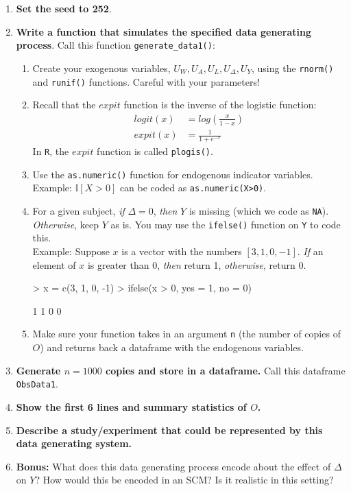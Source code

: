 \documentclass[answers]{exam}
\begin{document}
\begin{enumerate}
\item \textbf{Set the seed to 252}.
\item \textbf{Write a function that simulates the specified data generating process}. Call this function \texttt{generate\_data1()}:
\begin{enumerate}
\item Create your exogenous variables, $U_W, U_A, U_L, U_\Delta, U_Y$, using the \texttt{rnorm()} and \texttt{runif()} functions. Careful with your parameters!
\item Recall that the $expit$ function is the inverse of the logistic function:
\begin{align*}
logit(x) &= log\left(\frac{x}{1-x} \right)\\
expit(x) &=\frac{1}{1+e^{-x}}
 \end{align*}
In \texttt{R}, the $expit$ function is called \texttt{plogis()}.
\item Use the \texttt{as.numeric()} function for endogenous indicator variables. \\
Example: $\mathbb{I}[X > 0]$ can be coded as \texttt{as.numeric(X>0)}.
\item For a given subject, \textit{if} $\Delta = 0$, \textit{then} $Y$ is missing (which we code as \texttt{NA}). \textit{Otherwise}, keep $Y$ as is. You may use the \texttt{ifelse()} function on \texttt{Y} to code this. \\
Example: Suppose $x$ is a vector with the numbers $[3, 1, 0, -1]$. \textit{If} an element of $x$ is greater than 0, \textit{then} return 1, \textit{otherwise}, return 0.
\begin{Schunk}
\begin{Sinput}
> x = c(3, 1, 0, -1)
> ifelse(x > 0, yes = 1, no = 0)
\end{Sinput}
\begin{Soutput}
[1] 1 1 0 0
\end{Soutput}
\end{Schunk}
\item Make sure your function takes in an argument \texttt{n} (the number of copies of $O$) and returns back a dataframe with the endogenous variables.
\end{enumerate}
\item \textbf{Generate $n=1000$ copies and store in a dataframe.} Call this dataframe \texttt{ObsData1}.
\item \textbf{Show the first 6 lines and summary statistics of $O$.}
\item \textbf{Describe a study/experiment that could be represented by this data generating system.}
\item \textbf{Bonus:} What does this data generating process encode about the effect of $\Delta$ on $Y$? How would this be encoded in an SCM? Is it realistic in this setting?
\end{enumerate}
\end{document}
